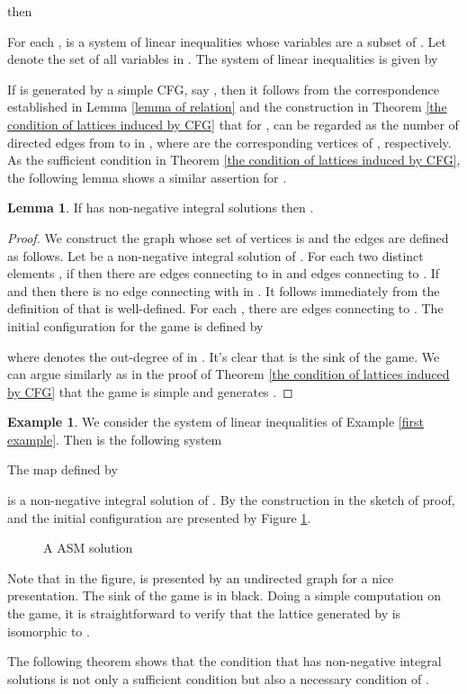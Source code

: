 \documentclass{article}
\theoremstyle{definition}
\newtheorem{examp}{Example}
\newtheorem{lem}{Lemma}
\begin{document}
then 



For each ,  is a system of linear inequalities whose variables are a subset of . Let  denote the set of all variables in . The system  of linear inequalities is given by  

If  is generated by a simple CFG, say , then it follows from the correspondence established in Lemma \ref{lemma of relation} and the construction in Theorem \ref{the condition of lattices induced by CFG} that for ,  can be regarded as the number of directed edges from  to  in , where  are the corresponding vertices of , respectively. As the sufficient condition in Theorem \ref{the condition of lattices induced by CFG}, the following lemma shows a similar assertion for .
\begin{lem}
\label{sufficient condition for L(ASM)}
If  has non-negative integral solutions then .
\end{lem}
\begin{proof}
We construct the graph  whose set of vertices is  and the edges are defined as follows. Let  be a non-negative integral solution of . For each two distinct elements , if  then there are  edges connecting  to  in  and  edges connecting  to .  If  and  then there is no edge connecting  with  in . It follows immediately from the definition of  that  is well-defined. For each , there are  edges connecting  to . The initial configuration  for the game is defined by 

where  denotes the out-degree of  in . It's clear that  is the sink of the game. We can argue similarly as in the proof of Theorem \ref{the condition of lattices induced by CFG} that the game is simple and generates . 
\end{proof}
\begin{examp}
\label{second example ?}
We consider the system of linear inequalities of Example \ref{first example}. Then  is the following system

The map  defined by 

is a non-negative integral solution of . By the construction in the sketch of proof,  and the initial configuration are presented by Figure \ref{fig:image2526}.
\begin{figure}[h]
\centering
{}
\qquad \qquad
{}
\caption{A ASM solution}
\label{fig:image2526}
\end{figure}
Note that in the figure,  is presented by an undirected graph for a nice presentation. The sink of the game is in black. Doing a simple computation on the game, it is straightforward to verify that the lattice generated by  is isomorphic to . 

The following theorem shows that the condition that  has non-negative integral solutions is not only a sufficient condition but also a necessary condition of . 
\end{examp}
\end{document}
